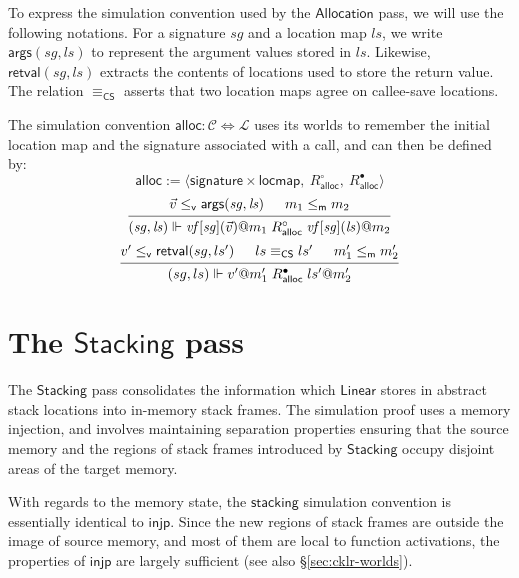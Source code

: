\documentclass[draft,11pt]{report}
\newcommand{\kw}[1]{\ensuremath{ \mathsf{#1} }}
\newcommand{\que}{\circ}         %
\newcommand{\ans}{\bullet}       %
\newcommand{\vref}{\le_\kw{v}}   %
\newcommand{\mext}{\le_\kw{m}}   %
\begin{document}
To express the simulation convention used by the \kw{Allocation} pass,
we will use the following notations.
For a signature $\mathit{sg}$ and a location map $\mathit{ls}$,
we write $\kw{args}(\mathit{sg}, \mathit{ls})$
to represent the argument values stored in $\mathit{ls}$.
Likewise,
$\kw{retval}(\mathit{sg}, \mathit{ls})$ extracts
the contents of locations used to store the return value.
The relation $\equiv_\kw{CS}$ asserts that
two location maps agree on callee-save locations.

The simulation convention
$\kw{alloc} : \mathcal{C} \Leftrightarrow \mathcal{L}$
uses its worlds to remember the initial location map
and the signature associated with a call,
and can then be defined by:
\[
  \kw{alloc} := \langle
      \kw{signature} \times \kw{locmap}, \:
      R_\kw{alloc}^\que, \:
      R_\kw{alloc}^\ans \rangle
\]
\[
  \begin{prooftree}
  \hypo{\vec{v} \vref \kw{args}(\mathit{sg}, \mathit{ls})}
  \hypo{m_1 \mext m_2}
  \infer2{
      (\mathit{sg}, \mathit{ls}) \Vdash
      \mathit{vf}[\mathit{sg}](\vec{v})@m_1
      \mathrel{R_\kw{alloc}^\que}
      \mathit{vf}[\mathit{sg}](\mathit{ls})@m_2}
  \end{prooftree}
\]
\[
  \begin{prooftree}
  \hypo{v' \vref \kw{retval}(sg, ls')}
  \hypo{ls \equiv_\kw{CS} ls'}
  \hypo{m_1' \mext m_2'}
  \infer3{
      (sg, ls) \Vdash
      v'@m_1'
      \mathrel{R_\kw{alloc}^\ans}
      ls'@m_2'}
  \end{prooftree}
\]


\section{The \kw{Stacking} pass} \label{sec:stacking} %

The \kw{Stacking} pass
consolidates the information which
\kw{Linear} stores in abstract stack locations
into in-memory stack frames.
The simulation proof uses a memory injection,
and involves maintaining separation properties
ensuring that the source memory and
the regions of stack frames
introduced by \kw{Stacking}
occupy disjoint areas of the target memory.

With regards to the memory state,
the \kw{stacking} simulation convention
is essentially identical to \kw{injp}.
Since the new regions of stack frames
are outside the image of source memory,
and most of them are local to
function activations,
the properties of \kw{injp}
are largely sufficient
(see also \S\ref{sec:cklr-worlds}).
\end{document}
